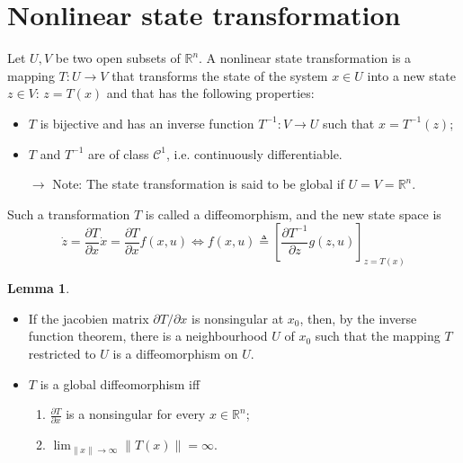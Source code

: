 \documentclass[12pt, openany]{report}
\theoremstyle{definition}
\newtheorem{lem}[thm]{Lemma}
\newcommand{\R}{\mathbb{R}}
\begin{document}
\section{Nonlinear state transformation}
Let \(U,V\) be two open subsets of \(\R^n\). A nonlinear state transformation is a mapping \(T: U\rightarrow V\) that transforms the state of the system \(x\in U\) into a new state \(z\in V\): \(z=T(x)\) and that has the following properties:
\begin{itemize}
    \item \(T\) is bijective and has an inverse function \(T^{-1}:V\rightarrow U\) such that \(x=T^{-1}(z)\);
    \item \(T\) and \(T^{-1}\) are of class \(\mathcal{C}^1\), i.e. continuously differentiable. 
    \item [\(\rightarrow\)] Note: The state transformation is said to be global if \(U=V=\R^n\).
\end{itemize}
Such a transformation \(T\) is called a diffeomorphism, and the new state space is 
\begin{equation}
    \dot z = \frac{\partial T}{\partial x}\dot x = \frac{\partial T}{\partial x}f(x,u) \Longleftrightarrow f(x,u) \triangleq \left[\frac{\partial T^{-1}}{\partial z}g(z,u)\right]_{z=T(x)}
\end{equation}
\begin{lem}
    \begin{itemize}
        \item If the jacobien matrix \(\partial T/\partial x\) is nonsingular at \(x_0\), then, by the inverse function theorem, there is a neighbourhood \(U\) of \(x_0\) such that the mapping \(T\) restricted to \(U\) is a diffeomorphism on \(U\).
        \item \(T\) is a global diffeomorphism iff \begin{enumerate}
            \item \(\frac{\partial T}{\partial x}\) is a nonsingular for every \(x\in \R^n\);
            \item \(\lim_{\lVert x\rVert \rightarrow \infty} \lVert T(x)\rVert =\infty\).
        \end{enumerate}
    \end{itemize}
\end{lem}
\end{document}
